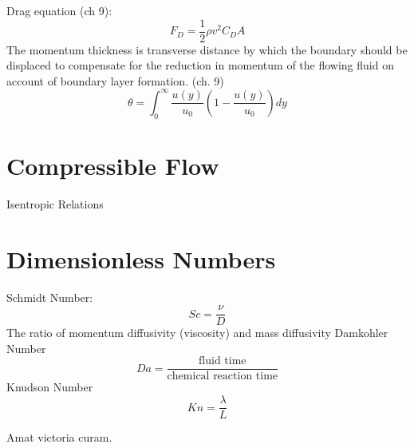 \documentclass{article}
\begin{document}


Drag equation (ch 9): 
\begin{equation}
  F_D = \frac{1}{2}\rho v^2 C_D A
\end{equation}
\newline
\newline
The momentum thickness is transverse distance by which the boundary should be displaced to compensate for the reduction in momentum of the flowing fluid on account of boundary layer formation. (ch. 9)
\begin{equation}
  \theta = \int^\infty_0 \frac{u(y)}{u_0}(1-\frac{u(y)}{u_0})dy
\end{equation}
\newline
\newline


%
%
\newpage
\section{Compressible Flow}

Isentropic Relations


%
%
\newpage
\section{Dimensionless Numbers}
Schmidt Number:
\begin{equation}
  Sc = \frac{\nu}{D}
\end{equation}
The ratio of momentum diffusivity (viscosity) and mass diffusivity
\newline
\newline
Damkohler Number
\begin{equation}
  Da = \frac{\textrm{fluid time}}{\textrm{chemical reaction time}}
\end{equation}
\newline
\newline
Knudson Number
\begin{equation}
  Kn = \frac{\lambda}{L}
\end{equation}

\newpage
Amat victoria curam. 
\end{document}
